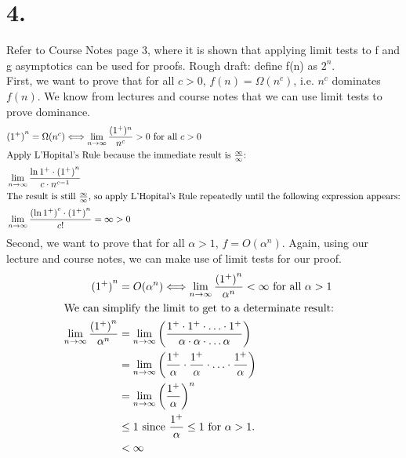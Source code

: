 \documentclass[11pt]{article}
\begin{document}
\section*{4.}
Refer to Course Notes page 3, where it is shown that applying limit tests to f and g asymptotics can be used for proofs. Rough draft: define f(n) as $2^n$.\\
First, we want to prove that for all $c>0$, $f(n)=\Omega(n^c)$, i.e. $n^c$ dominates $f(n)$. We know from lectures and course notes that we can use limit tests to prove dominance.
\begin{align*}
    &{(1^+)}^n = \Omega(n^c) \Longleftrightarrow 
    \lim_{n \to \infty} \frac{(1^+)^n}{n^c} > 0 \text{ for all } c > 0& \\
    \intertext{Apply L'Hopital's Rule because the immediate result is $\frac{\infty}{\infty}$:}
    &\lim_{n \to \infty} \frac{\ln 1^+ \cdot {(1^+)}^n}{c \cdot n^{c-1}}&\\
    \intertext{The result is still $\frac{\infty}{\infty}$, so apply L'Hopital's Rule repeatedly until the following expression appears:}
    &\lim_{n \to \infty} \frac{{(\ln 1^+)}^{c} \cdot {(1^+)}^n}{c!} = \infty > 0&
\end{align*}
Second, we want to prove that for all $\alpha > 1$, $f = O(\alpha ^n)$. Again, using our lecture and course notes, we can make use of limit tests for our proof.
\begin{align*}
    {(1^+)}^n &= O(\alpha^n) \Longleftrightarrow \lim_{n \to \infty} \frac{{(1^+)}^n}{\alpha^n} < \infty \text{ for all } \alpha > 1&\\
    \intertext{We can simplify the limit to get to a determinate result:}
    \lim_{n \to \infty} \frac{{(1^+)}^n}{\alpha^n} &= \lim_{n \to \infty} \left(\frac{{1^+ \cdot 1^+ \cdot \ldots \cdot 1^+}}{\alpha \cdot \alpha \cdot \ldots \alpha}\right)&\\
    &= \lim_{n \to \infty} \left(\frac{1^+}{\alpha} \cdot \frac{1^+}{\alpha} \cdot \ldots \cdot \frac{1^+}{\alpha}\right)&\\
    &= \lim_{n \to \infty} {\left(\frac{1^+}{\alpha}\right)}^n&\\
    &\leq 1 \text{ since $\frac{1^+}{\alpha} \leq 1$ for $\alpha > 1$.}&\\
    &<\infty
\end{align*}

\newpage
\end{document}
